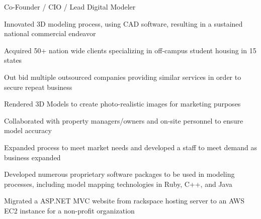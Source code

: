 \documentclass[]{alpha-cv}
\begin{document}
            
            {}
            {Co-Founder / CIO / Lead Digital Modeler}
            {\begin{itemize}{
                \item{Innovated 3D modeling process, using CAD software, resulting in a sustained national commercial endeavor
                    \begin{itemize}{
                            \item{Acquired 50+ nation wide clients specializing in off-campus student housing in 15 states}
                            \item{Out bid multiple outsourced companies providing similar services in order to secure repeat business}
                        }\end{itemize}
                }
                \item{Rendered 3D Models to create photo-realistic images for marketing purposes}
                \item{Collaborated with property managers/owners and on-site personnel to ensure model accuracy}
                \item{Expanded process to meet market needs and developed a staff to meet demand as business expanded
                    \begin{itemize}{
                            \item{Developed numerous proprietary software packages to be used in modeling processes, including model mapping technologies in Ruby, C++, and Java}
                        }\end{itemize}
                }
                \item{Migrated a ASP.NET MVC website from rackspace hosting server to an AWS EC2 instance for a non-profit organization}
            }
            \end{itemize}}
    
    
\end{document}
